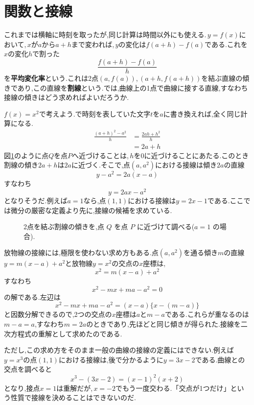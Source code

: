 \section{関数と接線}\label{節:導入変化}
これまでは横軸に時刻を取ったが,同じ計算は時間以外にも使える.\,$y=f(x)$において,\,$x$が$a$から$a+h$まで変われば,\,$y$の変化は$f(a+h)-f(a)$である.これを$x$の変化$h$で割った
\[
 \frac{f(a+h)-f(a)}h
\]
を\textbf{平均変化率}という.これは2点$(a,f(a))$,\,$(a+h,f(a+h))$を結ぶ直線の傾きであり,この直線を\textbf{割線}という.では,曲線上の1点で曲線に接する直線,すなわち接線の傾きはどう求めればよいだろうか.

$f(x)=x^2$で考えよう.で時刻を表していた文字$t$を$a$に書き換えれば,全く同じ計算になる.
\begin{align*}
 \frac{(a+h)^2-a^2}h
 &=\frac{2ah+h^2}h\\
 &=2a+h
\end{align*}
図\ref{図:導入接線}のように点$Q$を点$P$へ近づけることは,\,$h$を$0$に近づけることにあたる.このとき割線の傾き$2a+h$は$2a$に近づく.そこで,点$(a,a^2)$における接線は傾き$2a$の直線
\[
 y-a^2=2a(x-a)
\]
すなわち
\[
 y=2ax-a^2
\]
となりそうだ.例えば$a=1$なら,点$(1,1)$における接線は$y=2x-1$である.ここでは微分の厳密な定義より先に,接線の候補を求めている.

\begin{figure}[htbp]
\centering
{}
\caption{2点を結ぶ割線の傾きを,点 $Q$ を点 $P$ に近づけて調べる($a=1$ の場合).}
\label{図:導入接線}
\end{figure}

放物線の接線には,極限を使わない求め方もある.点$(a,a^2)$を通る傾き$m$の直線$y=m(x-a)+a^2$と放物線$y=x^2$の交点の$x$座標は,
\[
 x^2=m(x-a)+a^2
\]
すなわち
\[
 x^2-mx+ma-a^2=0
\]
の解である.左辺は
\[
 x^2-mx+ma-a^2=(x-a)\{x-(m-a)\}
\]
と因数分解できるので,2つの交点の$x$座標は$a$と$m-a$である.これらが重なるのは$m-a=a$,すなわち$m=2a$のときであり,先ほどと同じ傾きが得られた.接線を二次方程式の重解として求めたのである.

ただし,この求め方をそのまま一般の曲線の接線の定義にはできない.例えば$y=x^3$の点$(1,1)$における接線は,後で分かるように$y=3x-2$である.曲線との交点を調べると
\[
 x^3-(3x-2)=(x-1)^2(x+2)
\]
となり,接点$x=1$は重解だが,\,$x=-2$でもう一度交わる.「交点が1つだけ」という性質で接線を決めることはできないのだ.

